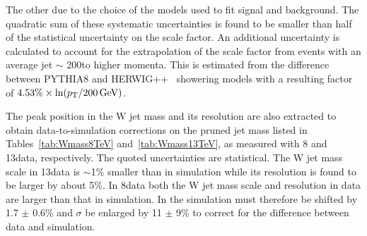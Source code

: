 The other due to the choice of the models used to fit signal and background.
The quadratic sum of these systematic uncertainties is found to be smaller than half of the statistical uncertainty on the scale factor. An additional uncertainty is calculated to account for the extrapolation of the scale factor from \ttbar events with an average jet \pt $\sim$ 200\GeV to higher momenta. This is estimated from the difference between PYTHIA8 and HERWIG++~\cite{Bahr:2008pv} showering models with a resulting factor of 
$4.53\% \times \displaystyle \ln(p_{\mathrm{T}}/200\,\text{Ge\hspace{-.08em}V})$.

The peak position in the W jet mass and its resolution are also extracted to obtain data-to-simulation corrections on the pruned jet mass listed in Tables~\ref{tab:Wmass8TeV} and~\ref{tab:Wmass13TeV}, as measured with 8 and 13\TeV data, respectively. The quoted uncertainties are statistical. The W jet mass scale in 13\TeV data is $\sim$1\% smaller than in simulation while its resolution is found to be larger by about 5\%. In 8\TeV data both the W jet mass scale and resolution in data are larger than that in simulation. In the simulation \mJ must therefore be shifted by 1.7 $\pm$ 0.6\% and $\sigma$ be enlarged by 11 $\pm$ 9\% to correct for the difference between data and simulation.

